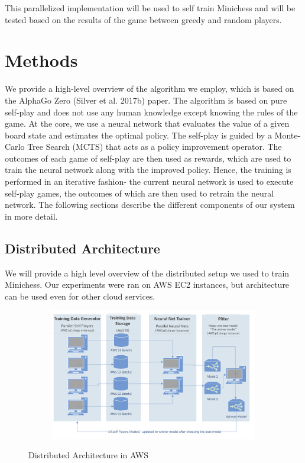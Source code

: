 \documentclass[11pt]{article}
\begin{document}
 This parallelized implementation will be used to self train Minichess and will be tested based on the results of the game between greedy and random players.

\section{Methods}

We provide a high-level overview of the algorithm we employ, which is based on the AlphaGo Zero (Silver et al. 2017b) paper. The algorithm is based on pure self-play and does not use any human knowledge except knowing the rules of the game. At the core, we use a neural network that evaluates the value of a given board state and estimates the optimal policy. The self-play is guided by a Monte-Carlo Tree Search (MCTS) that acts as a policy improvement operator. The outcomes of each game of self-play are then used as rewards, which are used to train the neural network along with the improved policy. Hence, the training is performed in an iterative fashion- the current neural network is used to execute self-play games, the outcomes of which are then used to retrain the neural network. The following sections describe the different components of our system in more detail. 

\subsection{Distributed Architecture}

We will provide a high level overview of the distributed setup we used to train Minichess. Our experiments were ran on AWS EC2 instances, but architecture can be used even for other cloud services. 

\begin{figure}[h!]
  \centering
  \begin{subfigure}[b]{1\linewidth}
    \includegraphics[width=\linewidth]{distributed_arch.png}
  \end{subfigure}
  \caption{Distributed Architecture in AWS}  
  \label{fig:distributed_arch}
\end{figure}
\end{document}

